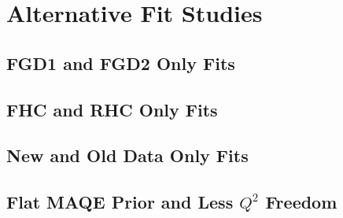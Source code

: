 \chapter{Alternative Fit Studies}
\section{FGD1 and FGD2 Only Fits}
\section{FHC and RHC Only Fits}
\section{New and Old Data Only Fits}
\section{Flat MAQE Prior and Less $Q^2$ Freedom}

\newpage